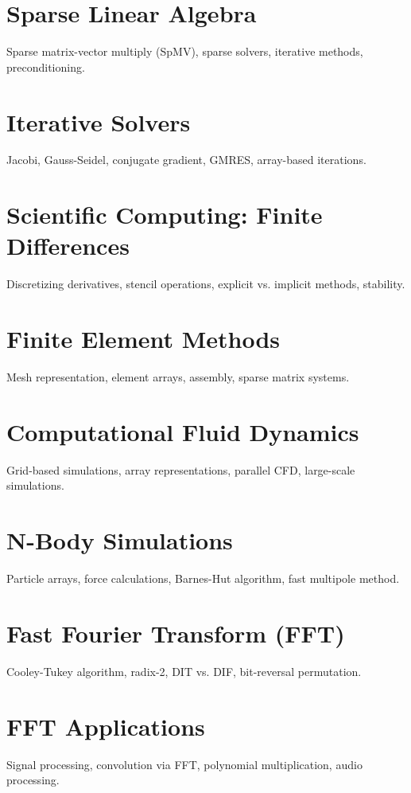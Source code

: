 \chapter{Sparse Linear Algebra}
Sparse matrix-vector multiply (SpMV), sparse solvers, iterative methods, preconditioning.

\chapter{Iterative Solvers}
Jacobi, Gauss-Seidel, conjugate gradient, GMRES, array-based iterations.

\chapter{Scientific Computing: Finite Differences}
Discretizing derivatives, stencil operations, explicit vs. implicit methods, stability.

\chapter{Finite Element Methods}
Mesh representation, element arrays, assembly, sparse matrix systems.

\chapter{Computational Fluid Dynamics}
Grid-based simulations, array representations, parallel CFD, large-scale simulations.

\chapter{N-Body Simulations}
Particle arrays, force calculations, Barnes-Hut algorithm, fast multipole method.


\chapter{Fast Fourier Transform (FFT)}
Cooley-Tukey algorithm, radix-2, DIT vs. DIF, bit-reversal permutation.

\chapter{FFT Applications}
Signal processing, convolution via FFT, polynomial multiplication, audio processing.

